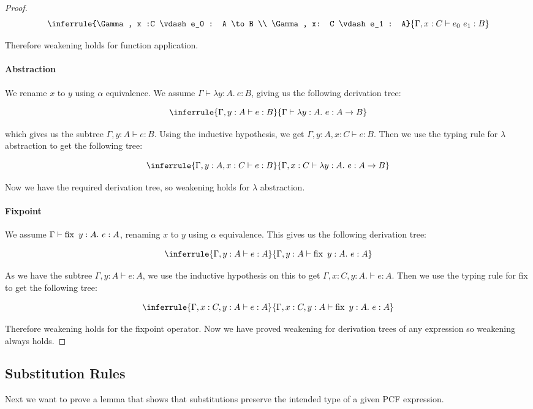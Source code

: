 \begin{proof}
$$
\inferrule{\Gamma, x :C \vdash e_0 : A \to B \\ \Gamma, x: C \vdash e_1 : A}{\Gamma, x : C \vdash e_0 \ e_1 : B}
$$

Therefore weakening holds for function application.


\paragraph{Abstraction} We rename $x$ to $y$ using $\alpha$ equivalence. We assume $\Gamma \vdash \lambda y : A. \ e : B$, giving us the following derivation tree:

$$
\inferrule{\Gamma, y : A \vdash e : B}{\Gamma \vdash \lambda y : A. \ e : A \to B}
$$

which gives us the subtree $\Gamma , y:A \vdash e : B$. Using the inductive hypothesis, we get $\Gamma , y:A , x : C \vdash e : B$. Then we use the typing rule for $\lambda$ abstraction to get the following tree:

$$
\inferrule{\Gamma, y : A, x : C \vdash e : B}{\Gamma, x : C \vdash \lambda y : A. \ e : A \to B}
$$

Now we have the required derivation tree, so weakening holds for $\lambda$ abstraction.
 

\paragraph{Fixpoint}
 
We assume $\Gamma \vdash \operatorname{fix} \ y :A. \ e: A$, renaming $x$ to $y$ using $\alpha$ equivalence. This gives us the following derivation tree:

$$
\inferrule{\Gamma, y:A \vdash e : A}{\Gamma, y : A \vdash \fix \ y : A. \ e : A}
$$

As we have the subtree $\Gamma, y:A \vdash e : A$, we use the inductive hypothesis on this to get $\Gamma, x :C, y:A. \vdash e : A$. Then we use the typing rule for fix to get the following tree:

$$
\inferrule{\Gamma, x : C, y:A \vdash e : A}{\Gamma, x : C, y : A \vdash \fix \ y : A. \ e : A}
$$

Therefore weakening holds for the fixpoint operator. Now we have proved weakening for derivation trees of any expression so weakening always holds.


\end{proof}


\subsection{Substitution Rules} 
Next we want to prove a lemma that shows that substitutions preserve the intended type of a given PCF expression.

